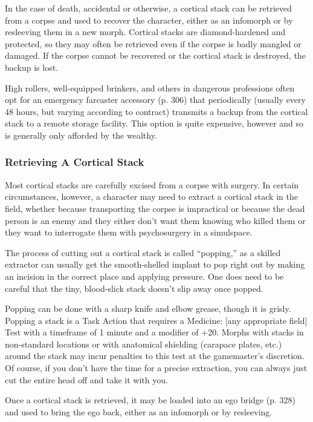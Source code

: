 In the case of death, accidental or otherwise, a cortical
stack can be retrieved from a corpse and used to
recover the character, either as an infomorph or by 
resleeving them in a new morph. Cortical stacks are 
diamond-hardened and protected, so they may often 
be retrieved even if the corpse is badly mangled or 
damaged. If the corpse cannot be recovered or the 
cortical stack is destroyed, the backup is lost.

High rollers, well-equipped brinkers, and others 
in dangerous professions often opt for an emergency 
farcaster accessory (p. 306) that periodically (usually 
every 48 hours, but varying according to contract) 
transmits a backup from the cortical stack to a remote 
storage facility. This option is quite expensive, however
and so is generally only afforded by the wealthy.

\subsubsection{Retrieving A Cortical Stack}

Most cortical stacks are carefully excised from a 
corpse with surgery. In certain circumstances, however, 
a character may need to extract a cortical stack in the 
field, whether because transporting the corpse is impractical
or because the dead person is an enemy and
they either don't want them knowing who killed them 
or they want to interrogate them with psychosurgery 
in a simulspace.

The process of cutting out a cortical stack is called 
``popping,'' as a skilled extractor can usually get the 
smooth-shelled implant to pop right out by making 
an incision in the correct place and applying pressure. 
One does need to be careful that the tiny, blood-slick 
stack doesn't slip away once popped.

Popping can be done with a sharp knife and elbow 
grease, though it is grisly. Popping a stack is a Task 
Action that requires a Medicine: [any appropriate 
field] Test with a timeframe of 1 minute and a modifier
of +20. Morphs with stacks in non-standard locations
or with anatomical shielding (carapace plates,
etc.) around the stack may incur penalties to this test 
at the gamemaster's discretion. Of course, if you don't 
have the time for a precise extraction, you can always 
just cut the entire head off and take it with you.

Once a cortical stack is retrieved, it may be loaded 
into an ego bridge (p. 328) and used to bring the ego 
back, either as an infomorph or by resleeving.

